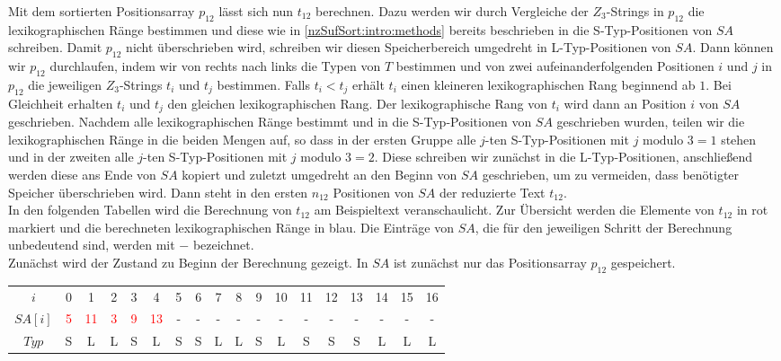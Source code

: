 Mit dem sortierten Positionsarray $p_{12}$ lässt sich nun $t_{12}$ berechnen. Dazu werden wir durch Vergleiche der $Z_3$-Strings in $p_{12}$ die lexikographischen Ränge bestimmen und diese wie in \cref{nzSufSort:intro:methods} bereits beschrieben in die S-Typ-Positionen von $SA$ schreiben. Damit $p_{12}$ nicht überschrieben wird, schreiben wir diesen Speicherbereich umgedreht in L-Typ-Positionen von $SA$. Dann können wir $p_{12}$ durchlaufen, indem wir von rechts nach links die Typen von $T$ bestimmen und von zwei aufeinanderfolgenden Positionen $i$ und $j$ in $p_{12}$ die jeweiligen $Z_3$-Strings $t_i$ und $t_j$ bestimmen. Falls $t_i < t_j$ erhält $t_i$ einen kleineren lexikographischen Rang beginnend ab $1$. Bei Gleichheit erhalten $t_i$ und $t_j$ den gleichen lexikographischen Rang. Der lexikographische Rang von $t_i$ wird dann an Position $i$ von $SA$ geschrieben. Nachdem alle lexikographischen Ränge bestimmt und in die S-Typ-Positionen von $SA$ geschrieben wurden, teilen wir die lexikographischen Ränge in die beiden Mengen auf, so dass in der ersten Gruppe alle $j$-ten S-Typ-Positionen mit $j \text{ modulo } 3 = 1$ stehen und in der zweiten alle $j$-ten S-Typ-Positionen mit $j \text{ modulo } 3 = 2$. Diese schreiben wir zunächst in die L-Typ-Positionen, anschließend werden diese ans Ende von $SA$ kopiert und zuletzt umgedreht an den Beginn von $SA$ geschrieben, um zu vermeiden, dass benötigter Speicher überschrieben wird. Dann steht in den ersten $n_{12}$ Positionen von $SA$ der reduzierte Text $t_{12}$. \\
In den folgenden Tabellen wird die Berechnung von $t_{12}$ am Beispieltext veranschaulicht. Zur Übersicht werden die Elemente von $t_{12}$ in rot markiert und die berechneten lexikographischen Ränge in blau. Die Einträge von $SA$, die für den jeweiligen Schritt der Berechnung unbedeutend sind, werden mit $-$ bezeichnet.\\
Zunächst wird der Zustand zu Beginn der Berechnung gezeigt. In $SA$ ist zunächst nur das Positionsarray $p_{12}$ gespeichert.

\begin{table}[H]
	\footnotesize
	\centering
	\begin{tabular}{c| c c c c c c c c c c c c c c c c c}
		$i$ & 0 & 1 & 2 & 3 & 4 & 5 & 6 & 7 & 8 & 9 & 10 & 11 & 12 & 13 & 14 & 15 & 16 \\
		$SA[i]$ & \textcolor{red}{5} & \textcolor{red}{11} & \textcolor{red}{3} & \textcolor{red}{9} & \textcolor{red}{13} & - & - & - & - & - & - & - & - & - & - & - & - \\
		$Typ$ & S & L & L & S & L & S & S & L & L & S & L & S & S & S & L & L & L
	\end{tabular}
\end{table}


